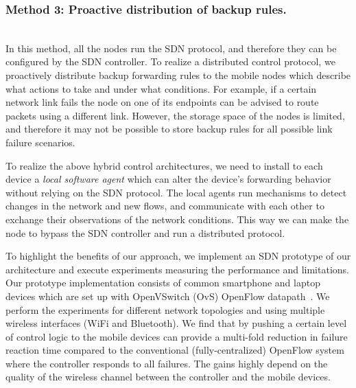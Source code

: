 \subsubsection{Method 3: Proactive distribution of backup rules.} ~\\ 
In this method, all the nodes run the SDN protocol, and therefore they can be configured by the SDN controller. 
To realize a distributed control protocol, we proactively distribute backup forwarding rules to the mobile nodes which describe what actions to take and under what conditions.
For example, if a certain network link fails the node on one of its endpoints can be advised to route packets using a different link. 
However, the storage space of the nodes is limited, and therefore it may not be possible to store backup rules for all possible link failure scenarios.


To realize the above hybrid control architectures, we need to install to each device a \emph{local software agent} which can alter the device's forwarding behavior without relying on the SDN protocol. The local agents run mechanisms to detect changes in the network and new flows, and communicate with each other to exchange their observations of the network conditions.
This way we can make the node to bypass the SDN controller and run a distributed protocol.

To highlight the benefits of our approach, we implement an SDN prototype of our architecture and execute experiments measuring the performance and limitations.
Our prototype implementation consists of common smartphone and laptop devices which are set up with OpenVSwitch (OvS) OpenFlow datapath~\cite{ovs}. 
We perform the experiments for different network topologies and using multiple wireless interfaces (WiFi and Bluetooth). We find that by pushing a certain level of control logic to the mobile devices can provide a multi-fold reduction in failure reaction time compared to the conventional (fully-centralized) OpenFlow system where the controller responds to all failures. The gains highly depend on the quality of the wireless channel between the controller and the mobile devices.





